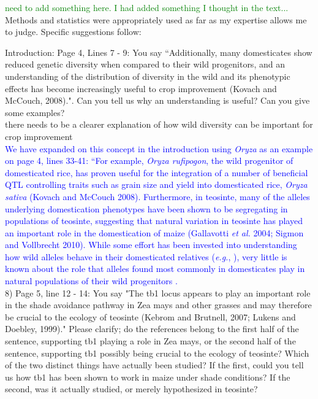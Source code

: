 \documentclass[11pt]{article}
\newcommand{\res}[1]{\noindent \textcolor{blue}{{#1}} \\}
\newcommand{\lev}[1]{\noindent \textcolor{green}{{#1}} \\}
\newcommand{\mbh}[1]{\noindent \textcolor{Dandelion}{{#1}}\\}
\begin{document}
\lev{need to add something here. I had added something I thought in the text...}

Methods and statistics were appropriately used as far as my expertise allows me to judge.
Specific suggestions follow:

Introduction:
Page 4, Lines 7 - 9: You say ``Additionally, many domesticates show reduced genetic diversity when compared to their wild progenitors, and an understanding of the distribution of diversity in the wild and its phenotypic effects has become increasingly useful to crop improvement (Kovach and McCouch, 2008).".  Can you tell us why an understanding is useful? Can you give some examples?\\

\mbh{there needs to be a clearer explanation of how wild diversity can be important for crop improvement}

\res{We have expanded on this concept in the introduction using \emph{Oryza} as an example on page 4, lines 33-41: ``For example, \emph{Oryza rufipogon}, the wild progenitor of domesticated rice, has proven useful for the integration of a number of beneficial QTL controlling traits such as grain size and yield into domesticated rice, \emph{Oryza sativa} (Kovach and McCouch 2008). Furthermore, in teosinte, many of the alleles underlying domestication phenotypes have been shown to be segregating in populations of teosinte, suggesting that natural variation in teosinte has played an important role in the domestication of maize (Gallavotti \emph{et al.} 2004; Sigmon and Vollbrecht 2010). While some effort has been invested into understanding how wild alleles behave in their domesticated relatives (\emph{e.g.}, \citealt{Bai2007}), very little is known about the role that alleles found most commonly in domesticates play in natural populations of their wild progenitors \citep{Whitton1997}.}

8) Page 5, line 12 - 14: You say "The tb1 locus appears to play an important role in the shade avoidance pathway in Zea mays and other grasses and may therefore be crucial to the ecology of teosinte (Kebrom and Brutnell, 2007; Lukens and Doebley, 1999)." Please clarify; do the references belong to the first half of the sentence, supporting tb1 playing a role in Zea mays, or the second half of the sentence, supporting tb1 possibly being crucial to the ecology of teosinte? Which of the two distinct things have actually been studied? If the first, could you tell us how tb1 has been shown to work in maize under shade conditions? If the second, was it actually studied, or merely hypothesized in teosinte?\\ 
\end{document}
